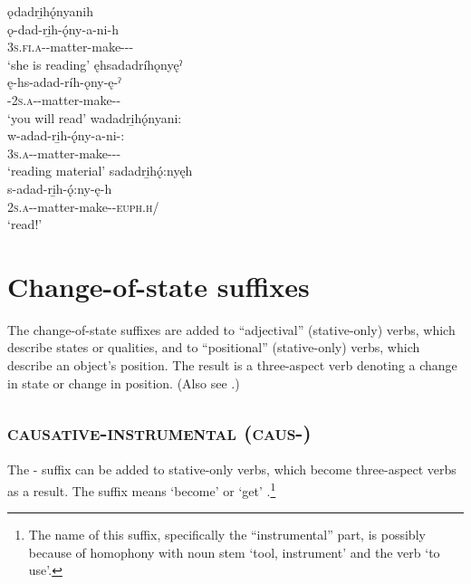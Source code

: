 \ea\label{ex:benefex8}
\ea ǫdadri̱hǫ́nyanih\\
\gll ǫ-dad-ri̱h-ǫ́ny-a-ni-h\\
 \textsc{3s.fi.a}-{}-matter-make-{\joinerA}-{\benefactive}-{\habitual}\\
\glt `she is reading'
\ex ęhsadadríhǫnyęˀ\\
\gll ę-hs-adad-ríh-ǫny-ę-ˀ\\
 \fut-\textsc{2s.a}-{}-matter-make-{\benefactive}-{\punctual}\\
\glt `you will read'
\ex wadadri̱hǫ́nyani:\\
\gll w-adad-ri̱h-ǫ́ny-a-ni-:\\
 \textsc{3s.a}\exsc{}-{}-matter-make-{\joinerA}-{\benefactive}-{\stative}\\
\glt `reading material'
\ex sadadri̱hǫ́:nyęh\\
\gll s-adad-ri̱h-ǫ́:ny-ę-h\\
 \textsc{2s.a}-{}-matter-make-{\benefactive}-\textsc{euph.h}/{\noaspect}\\
\glt `read!'
\z
\z

\section{Change-of-state suffixes} \label{Change-of-state suffixes}

The change-of-state suffixes are added to “adjectival” (stative-only) verbs, which describe states or qualities, and to “positional” (stative-only) verbs, which describe an object’s position. The result is a three-aspect verb denoting a change in state or change in position. (Also see .)

\subsection{ \textsc{causative-instrumental} (\textsc{caus}-\instrumental)} \label{[-hsd] (causative-instrumental)}
The  {\causative}-{\instrumental} suffix can be added to stative-only verbs, which become three-aspect verbs as a result. The  suffix means ‘become’ or ‘get’ .\footnote{The name of this suffix, specifically the “instrumental” part, is possibly because of homophony with noun stem  ‘tool, instrument’ and the verb  ‘to use’.}
 

